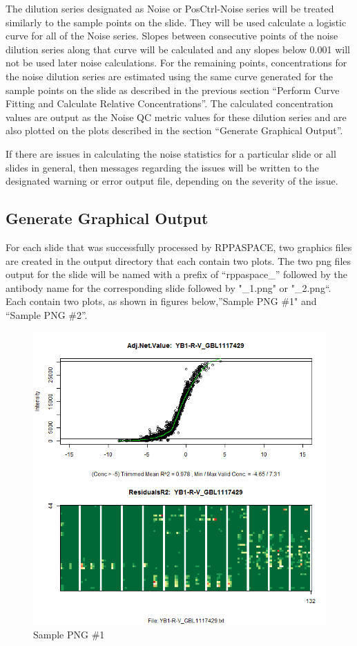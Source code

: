 \documentclass[
]{article}
\begin{document}
The dilution series designated as Noise or PosCtrl-Noise series will be
treated similarly to the sample points on the slide. They will be used
calculate a logistic curve for all of the Noise series. Slopes between
consecutive points of the noise dilution series along that curve will be
calculated and any slopes below 0.001 will not be used later noise
calculations. For the remaining points, concentrations for the noise
dilution series are estimated using the same curve generated for the
sample points on the slide as described in the previous section
``Perform Curve Fitting and Calculate Relative Concentrations''. The
calculated concentration values are output as the Noise QC metric values
for these dilution series and are also plotted on the plots described in
the section ``Generate Graphical Output''.

If there are issues in calculating the noise statistics for a particular
slide or all slides in general, then messages regarding the issues will
be written to the designated warning or error output file, depending on
the severity of the issue.

\hypertarget{process_6}{%
\subsection{Generate Graphical Output}\label{process_6}}

For each slide that was successfully processed by RPPASPACE, two
graphics files are created in the output directory that each contain two
plots. The two png files output for the slide will be named with a
prefix of ``rppaspace\_'' followed by the antibody name for the
corresponding slide followed by "\_1.png" or "\_2.png``. Each contain
two plots, as shown in figures below,''Sample PNG \#1" and ``Sample PNG
\#2''.

\begin{figure}
\centering
\includegraphics{images/sample_png_1.png}
\caption{Sample PNG \#1}
\end{figure}
\end{document}
